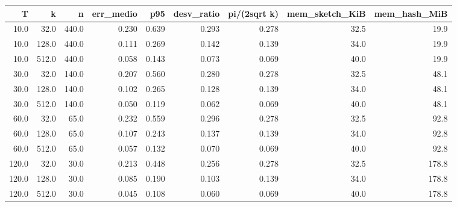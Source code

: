 \begin{tabular}{rrrrrrrrr}
\toprule
T & k & n & err\_medio & p95 & desv\_ratio & pi/(2sqrt k) & mem\_sketch\_KiB & mem\_hash\_MiB \\
\midrule
10.0 & 32.0 & 440.0 & 0.230 & 0.639 & 0.293 & 0.278 & 32.5 & 19.9 \\
10.0 & 128.0 & 440.0 & 0.111 & 0.269 & 0.142 & 0.139 & 34.0 & 19.9 \\
10.0 & 512.0 & 440.0 & 0.058 & 0.143 & 0.073 & 0.069 & 40.0 & 19.9 \\
30.0 & 32.0 & 140.0 & 0.207 & 0.560 & 0.280 & 0.278 & 32.5 & 48.1 \\
30.0 & 128.0 & 140.0 & 0.102 & 0.265 & 0.128 & 0.139 & 34.0 & 48.1 \\
30.0 & 512.0 & 140.0 & 0.050 & 0.119 & 0.062 & 0.069 & 40.0 & 48.1 \\
60.0 & 32.0 & 65.0 & 0.232 & 0.559 & 0.296 & 0.278 & 32.5 & 92.8 \\
60.0 & 128.0 & 65.0 & 0.107 & 0.243 & 0.137 & 0.139 & 34.0 & 92.8 \\
60.0 & 512.0 & 65.0 & 0.057 & 0.132 & 0.070 & 0.069 & 40.0 & 92.8 \\
120.0 & 32.0 & 30.0 & 0.213 & 0.448 & 0.256 & 0.278 & 32.5 & 178.8 \\
120.0 & 128.0 & 30.0 & 0.085 & 0.190 & 0.103 & 0.139 & 34.0 & 178.8 \\
120.0 & 512.0 & 30.0 & 0.045 & 0.108 & 0.060 & 0.069 & 40.0 & 178.8 \\
\bottomrule
\end{tabular}

